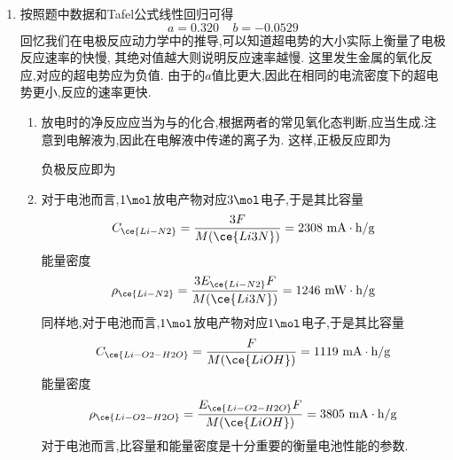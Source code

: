 \documentclass{ctexart}
\begin{document}
\begin{solution}
    \begin{enumerate}[label=\tbf{\arabic{Pcounter}-\arabic*},topsep=0pt,parsep=0pt,itemsep=0pt,partopsep=0pt]
        \item 按照题中数据和Tafel公式线性回归可得
            \[a=0.320\ \ \ \ \ b=-0.0529\]
            回忆我们在电极反应动力学中的推导,可以知道超电势的大小实际上衡量了电极反应速率的快慢,%
            其绝对值越大则说明反应速率越慢.%
            这里发生金属的氧化反应,对应的超电势应为负值.%
            由于的$a$值比更大,因此在相同的电流密度下的超电势更小,反应的速率更快.
        \begin{enumerate}[label=\tbf{\arabic{Pcounter}-2-\arabic*},topsep=0pt,parsep=0pt,itemsep=0pt,partopsep=0pt,leftmargin=10pt]
            \item 放电时的净反应应当为与的化合,根据两者的常见氧化态判断,应当生成.注意到电解液为,因此在电解液中传递的离子为.%
                这样,正极反应即为
                \begin{tightcenter}
                \end{tightcenter}
                负极反应即为
                \begin{tightcenter}
                \end{tightcenter}
            \item 对于电池而言,$1\mol$放电产物对应$3\mol$电子,于是其比容量
                \[C_{\ce{Li-N2}}=\dfrac{3F}{M(\ce{Li3N})}=2308\text{ mA}\cdot\text{h}/\text{g}\]
                能量密度
                \[\rho_{\ce{Li-N2}}=\dfrac{3E_{\ce{Li-N2}}F}{M(\ce{Li3N})}=1246\text{ mW}\cdot\text{h}/\text{g}\]
                同样地,对于电池而言,$1\mol$放电产物对应$1\mol$电子,于是其比容量
                \[C_{\ce{Li-O2-H2O}}=\dfrac{F}{M(\ce{LiOH})}=1119\text{ mA}\cdot\text{h}/\text{g}\]
                能量密度
                \[\rho_{\ce{Li-O2-H2O}}=\dfrac{E_{\ce{Li-O2-H2O}}F}{M(\ce{LiOH})}=3805\text{ mA}\cdot\text{h}/\text{g}\]
                对于电池而言,比容量和能量密度是十分重要的衡量电池性能的参数.
        \end{enumerate}
    \end{enumerate}
\end{solution}
\end{document}
